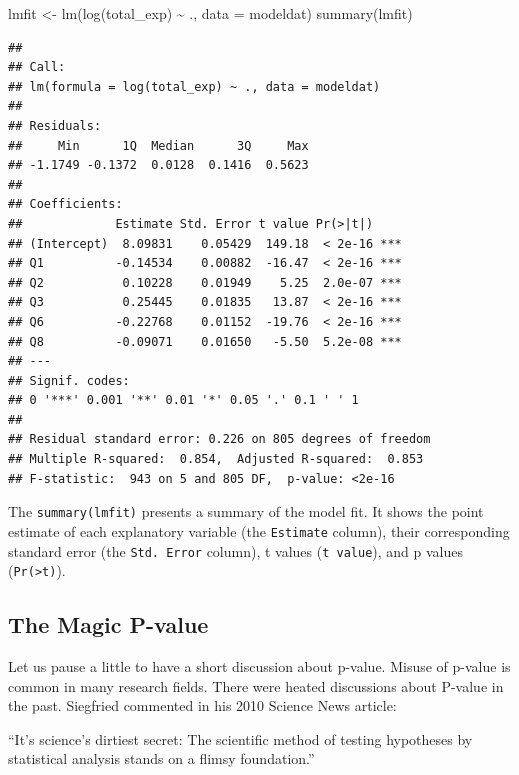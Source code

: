 \documentclass[
  12pt,
]{krantz}
\makeatletter
\newenvironment{Shaded}{\begin{snugshade}}{\end{snugshade}}
\newcommand{\AttributeTok}[1]{\textcolor[rgb]{0.61,0.61,0.61}{#1}}
\newcommand{\FunctionTok}[1]{\textcolor[rgb]{0,0,0}{#1}}
\newcommand{\NormalTok}[1]{#1}
\newcommand{\OtherTok}[1]{\textcolor[rgb]{0.37,0.37,0.37}{#1}}
\newcommand{\SpecialCharTok}[1]{\textcolor[rgb]{0,0,0}{#1}}
\renewenvironment{quote}{\begin{VF}}{\end{VF}}
\newenvironment{kframe}{%
\medskip{}
\setlength{\fboxsep}{.8em}
 \def\at@end@of@kframe{}%
 \ifinner\ifhmode%
  \def\at@end@of@kframe{\end{minipage}}%
  \begin{minipage}{\columnwidth}%
 \fi\fi%
 \def\FrameCommand##1{\hskip\@totalleftmargin \hskip-\fboxsep
 \colorbox{shadecolor}{##1}\hskip-\fboxsep
     \hskip-\linewidth \hskip-\@totalleftmargin \hskip\columnwidth}%
 \MakeFramed {\advance\hsize-\width
   \@totalleftmargin\z@ \linewidth\hsize
   \@setminipage}}%
 {\par\unskip\endMakeFramed%
 \at@end@of@kframe}
\renewenvironment{Shaded}{\begin{kframe}}{\end{kframe}}
\makeatother
\begin{document}
\begin{Shaded}
\begin{Highlighting}[]
\NormalTok{lmfit }\OtherTok{\textless{}{-}} \FunctionTok{lm}\NormalTok{(}\FunctionTok{log}\NormalTok{(total\_exp) }\SpecialCharTok{\textasciitilde{}}\NormalTok{ ., }\AttributeTok{data =}\NormalTok{ modeldat)}
\FunctionTok{summary}\NormalTok{(lmfit)}
\end{Highlighting}
\end{Shaded}

\begin{verbatim}
## 
## Call:
## lm(formula = log(total_exp) ~ ., data = modeldat)
## 
## Residuals:
##     Min      1Q  Median      3Q     Max 
## -1.1749 -0.1372  0.0128  0.1416  0.5623 
## 
## Coefficients:
##             Estimate Std. Error t value Pr(>|t|)    
## (Intercept)  8.09831    0.05429  149.18  < 2e-16 ***
## Q1          -0.14534    0.00882  -16.47  < 2e-16 ***
## Q2           0.10228    0.01949    5.25  2.0e-07 ***
## Q3           0.25445    0.01835   13.87  < 2e-16 ***
## Q6          -0.22768    0.01152  -19.76  < 2e-16 ***
## Q8          -0.09071    0.01650   -5.50  5.2e-08 ***
## ---
## Signif. codes:  
## 0 '***' 0.001 '**' 0.01 '*' 0.05 '.' 0.1 ' ' 1
## 
## Residual standard error: 0.226 on 805 degrees of freedom
## Multiple R-squared:  0.854,  Adjusted R-squared:  0.853 
## F-statistic:  943 on 5 and 805 DF,  p-value: <2e-16
\end{verbatim}

The \texttt{summary(lmfit)} presents a summary of the model fit. It shows the point estimate of each explanatory variable (the \texttt{Estimate} column), their corresponding standard error (the \texttt{Std.\ Error} column), t values (\texttt{t\ value}), and p values (\texttt{Pr(\textgreater{}\textbar{}t\textbar{})}).

\hypertarget{the-magic-p-value}{%
\subsection{The Magic P-value}\label{the-magic-p-value}}

Let us pause a little to have a short discussion about p-value. Misuse of p-value is common in many research fields. There were heated discussions about P-value in the past. Siegfried commented in his 2010 Science News article: 

\begin{quote}
``It's science's dirtiest secret: The scientific method of testing hypotheses by statistical analysis stands on a flimsy foundation.''
\end{quote}
\end{document}
